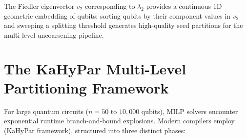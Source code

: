 The Fiedler eigenvector $v_2$ corresponding to $\lambda_2$ provides a continuous 1D geometric embedding of qubits: sorting qubits by their component values in $v_2$ and sweeping a splitting threshold generates high-quality seed partitions for the multi-level uncoarsening pipeline.

\section{The KaHyPar Multi-Level Partitioning Framework}
\label{sec:kahypar_framework}

For large quantum circuits ($n = 50\text{ to }10,000$ qubits), MILP solvers encounter exponential runtime branch-and-bound explosions. Modern compilers employ  (KaHyPar framework), structured into three distinct phases:

